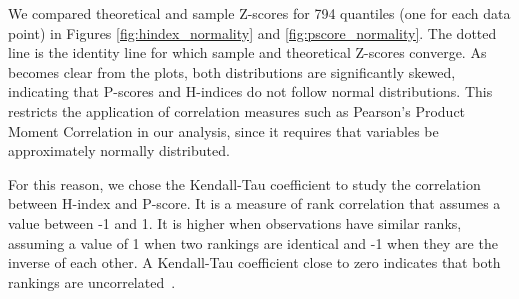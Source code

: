 \documentclass[notitlepage]{svjour3}
\begin{document}
We compared theoretical and sample Z-scores for 794 quantiles (one for each data point) in Figures
\ref{fig:hindex_normality} and \ref{fig:pscore_normality}. The dotted line is the identity line for
which sample and theoretical Z-scores converge. As becomes clear from the plots, both distributions
are significantly skewed, indicating that P-scores and H-indices do not follow normal
distributions. This restricts the application of correlation measures such as Pearson's Product 
Moment Correlation in our analysis, since it requires that variables be approximately normally 
distributed. 

For this reason, we chose the Kendall-Tau coefficient to
study the correlation 
between H-index and P-score. It is a measure of rank
correlation that assumes a value between
-1 and 1. It is higher when observations have similar
ranks, assuming a value of 1
when two rankings are identical and -1 when they are the inverse of each other. 
A Kendall-Tau coefficient close to zero indicates
that both rankings are uncorrelated~\cite{Kendall1955,Baeza-Yates2011}.
\end{document}
